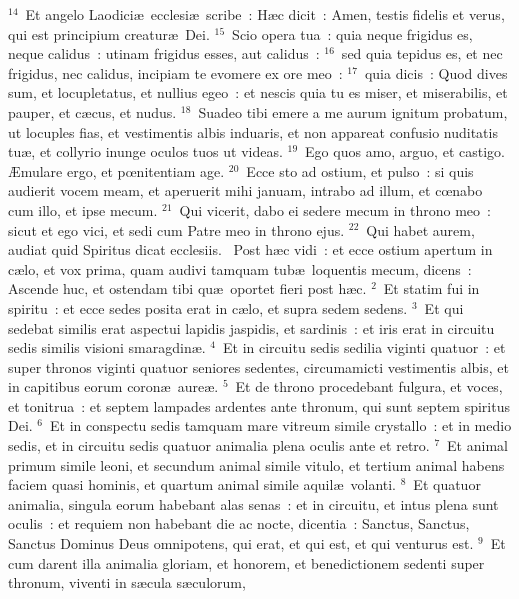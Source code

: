 ${}^{14}$~Et angelo Laodici\ae\ ecclesi\ae\ scribe~: H\ae c dicit~: Amen, testis fidelis et verus, qui est principium creatur\ae\ Dei.
${}^{15}$~Scio opera tua~: quia neque frigidus es, neque calidus~: utinam frigidus esses, aut calidus~:
${}^{16}$~sed quia tepidus es, et nec frigidus, nec calidus, incipiam te evomere ex ore meo~:
${}^{17}$~quia dicis~: Quod dives sum, et locupletatus, et nullius egeo~: et nescis quia tu es miser, et miserabilis, et pauper, et c\ae cus, et nudus.
${}^{18}$~Suadeo tibi emere a me aurum ignitum probatum, ut locuples fias, et vestimentis albis induaris, et non appareat confusio nuditatis tu\ae , et collyrio inunge oculos tuos ut videas.
${}^{19}$~Ego quos amo, arguo, et castigo. \AE mulare ergo, et pœnitentiam age.
${}^{20}$~Ecce sto ad ostium, et pulso~: si quis audierit vocem meam, et aperuerit mihi januam, intrabo ad illum, et cœnabo cum illo, et ipse mecum.
${}^{21}$~Qui vicerit, dabo ei sedere mecum in throno meo~: sicut et ego vici, et sedi cum Patre meo in throno ejus.
${}^{22}$~Qui habet aurem, audiat quid Spiritus dicat ecclesiis.
~\lettrine[lines=10,image=true,loversize=0.05,lraise=-0.03]{P}{}ost h\ae c vidi~: et ecce ostium apertum in c\ae lo, et vox prima, quam audivi tamquam tub\ae\ loquentis mecum, dicens~: Ascende huc, et ostendam tibi qu\ae\ oportet fieri post h\ae c.
${}^{2}$~Et statim fui in spiritu~: et ecce sedes posita erat in c\ae lo, et supra sedem sedens.
${}^{3}$~Et qui sedebat similis erat aspectui lapidis jaspidis, et sardinis~: et iris erat in circuitu sedis similis visioni smaragdin\ae .
${}^{4}$~Et in circuitu sedis sedilia viginti quatuor~: et super thronos viginti quatuor seniores sedentes, circumamicti vestimentis albis, et in capitibus eorum coron\ae\ aure\ae .
${}^{5}$~Et de throno procedebant fulgura, et voces, et tonitrua~: et septem lampades ardentes ante thronum, qui sunt septem spiritus Dei.
${}^{6}$~Et in conspectu sedis tamquam mare vitreum simile crystallo~: et in medio sedis, et in circuitu sedis quatuor animalia plena oculis ante et retro.
${}^{7}$~Et animal primum simile leoni, et secundum animal simile vitulo, et tertium animal habens faciem quasi hominis, et quartum animal simile aquil\ae\ volanti.
${}^{8}$~Et quatuor animalia, singula eorum habebant alas senas~: et in circuitu, et intus plena sunt oculis~: et requiem non habebant die ac nocte, dicentia~: Sanctus, Sanctus, Sanctus Dominus Deus omnipotens, qui erat, et qui est, et qui venturus est.
${}^{9}$~Et cum darent illa animalia gloriam, et honorem, et benedictionem sedenti super thronum, viventi in s\ae cula s\ae culorum,
